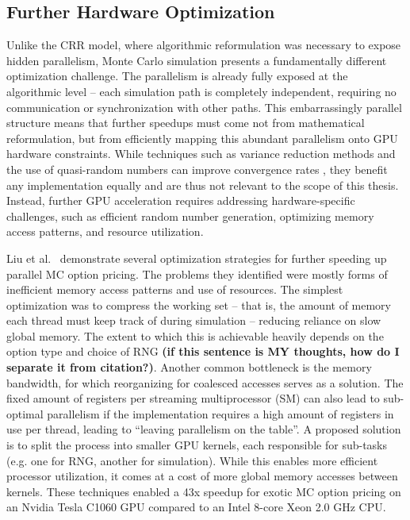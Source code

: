 \documentclass[english,12pt,a4paper,pdftex,sci,utf8]{aaltothesis}
\begin{document}
\subsection{Further Hardware Optimization}
Unlike the CRR model, where algorithmic reformulation was necessary to expose hidden parallelism, Monte Carlo simulation presents a fundamentally different optimization challenge. The parallelism is already fully exposed at the algorithmic level -- each simulation path is completely independent, requiring no communication or synchronization with other paths. This embarrassingly parallel structure means that further speedups must come not from mathematical reformulation, but from efficiently mapping this abundant parallelism onto GPU hardware constraints. While techniques such as variance reduction methods and the use of quasi-random numbers can improve convergence rates \cite{clelow1998implementing}, they benefit any implementation equally and are thus not relevant to the scope of this thesis. Instead, further GPU acceleration requires addressing hardware-specific challenges, such as efficient random number generation, optimizing memory access patterns, and resource utilization. 

Liu et al.\ \cite{liu2010efficient} demonstrate several optimization strategies for further speeding up parallel MC option pricing. The problems they identified were mostly forms of inefficient memory access patterns and use of resources. The simplest optimization was to compress the working set -- that is, the amount of memory each thread must keep track of during simulation -- reducing reliance on slow global memory. The extent to which this is achievable heavily depends on the option type and choice of RNG \textbf{(if this sentence is MY thoughts, how do I separate it from citation?)}. Another common bottleneck is the memory bandwidth, for which reorganizing for coalesced accesses serves as a solution. The fixed amount of registers per streaming multiprocessor (SM) can also lead to sub-optimal parallelism if the implementation requires a high amount of registers in use per thread, leading to ``leaving parallelism on the table''. A proposed solution is to split the process into smaller GPU kernels, each responsible for sub-tasks (e.g. one for RNG, another for simulation). While this enables more efficient processor utilization, it comes at a cost of more global memory accesses between kernels. These techniques enabled a 43x speedup for exotic MC option pricing on an Nvidia Tesla C1060 GPU compared to an Intel 8-core Xeon 2.0 GHz CPU.
\end{document}
